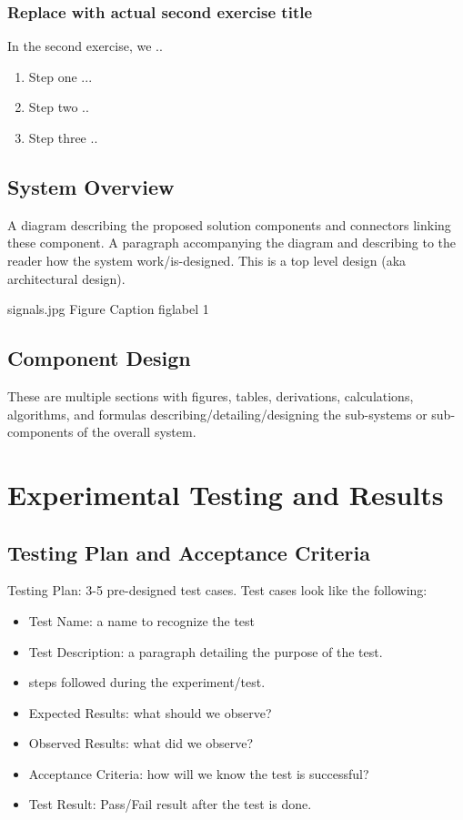 \subsubsection{Replace with actual second exercise title}
In the second exercise, we .. 

\begin{enumerate}
\item Step one ...
\item Step two .. 
\item Step three .. 
\end{enumerate}

\subsection{System Overview}
A diagram describing the proposed solution components and connectors linking these component. A paragraph accompanying the diagram and describing to the reader how the system work/is-designed. This is a top level design (aka architectural design). 

 \ecefigure
{signals.jpg}
{Figure Caption} %
{figlabel}
{1}  %
\FloatBarrier 

\subsection{Component Design}
These are multiple sections with figures, tables, derivations, calculations, algorithms, and formulas describing/detailing/designing the sub-systems or sub-components of the overall system. 

\section{Experimental Testing and Results}

\subsection{Testing Plan and Acceptance Criteria}
Testing Plan: 3-5 pre-designed test cases. Test cases look like the following: 
\begin{itemize}
    \item Test Name: a name to recognize the test
    \item Test Description: a paragraph detailing the purpose of the test. 

\item steps followed during the experiment/test. 
\item	Expected Results: what should we observe?
\item Observed Results: what did we observe?
\item	Acceptance Criteria: how will we know the test is successful?
\item Test Result: Pass/Fail result after the test is done. 

\end{itemize}

